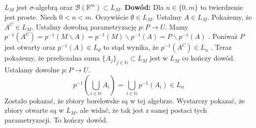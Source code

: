 \begin{tw}
    $L_M$ jest $\sigma$-algebrą oraz $\mathcal{B}(\mathbb{R}^m) \subset L_M$.
    \newline
    \textbf{Dowód:}\newline
    Dla $n \in \{0, m\}$ to twierdzenie jest proste. Niech $0 < n < m$. Oczywiście $\emptyset \in L_M$. Ustalmy $A \in L_M$. 
    Pokażemy, że $A^C \in L_M$. Ustalmy dowolną parametryzację
    $p:P \rightarrow U$. Mamy $p^{-1}(A^C) = p^{-1}(M \backslash A) = p^{-1}(M) \backslash p^{-1}(A) = P \backslash p^{-1}(A)$ . Poniważ $P$ jest otwarty oraz $p^{-1}(A) \in L_d$ to stąd wynika, że $p^{-1}(A^C) \in L_n$ .
    Teraz pokażemy, że przeliczalna suma $\{A_j\}_{j \in \mathbb{N}} \subset L_M$ jest w $L_M$ co kończy dowód. Ustalamy dowolne $p: P \rightarrow U$. $$ 
    p^{-1}(\bigcup_{i \in \mathbb{N}} A_i ) = \bigcup_{i \in \mathbb{N}} p^{-1}(A_i) \in L_n
    $$ Zostało pokazać, że zbiory borelowske są w tej algebrze. Wystarczy pokazać, że zbiory otwarte są w $L_M$, ale widać, że tak jest z samej postaci tych parametryzacji. To kończy dowód.  
\end{tw}